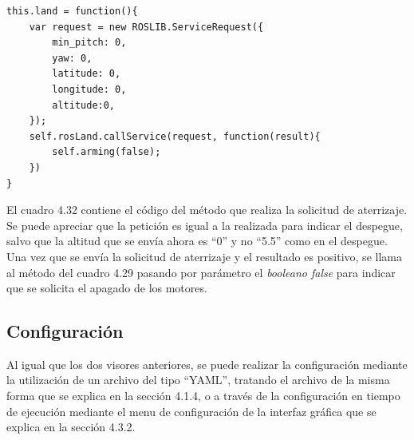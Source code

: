\begin{lstlisting}[caption= Método para cambiar el modo de pilotaje, label=cod.setMode]
this.land = function(){
	var request = new ROSLIB.ServiceRequest({
		min_pitch: 0,
		yaw: 0,
		latitude: 0,
		longitude: 0,
		altitude:0,
	});
	self.rosLand.callService(request, function(result){
		self.arming(false);
	})
}
\end{lstlisting}

El cuadro 4.32 contiene el código del método que realiza la solicitud de aterrizaje. Se puede apreciar que la petición es igual a la realizada para indicar el despegue, salvo que la altitud que se envía ahora es ``0'' y no ``5.5'' como en el despegue. Una vez que se envía la solicitud de aterrizaje y el resultado es positivo, se llama al método del cuadro 4.29 pasando por parámetro el \textit{booleano false} para indicar que se solicita el apagado de los motores.

\subsection{Configuración}
Al igual que los dos visores anteriores, se puede realizar la configuración mediante la utilización de un archivo del tipo ``YAML'', tratando el archivo de la misma forma que se explica en la sección 4.1.4,  o a través de la configuración en tiempo de ejecución mediante el menu de configuración de la interfaz gráfica que se explica en la sección 4.3.2.


